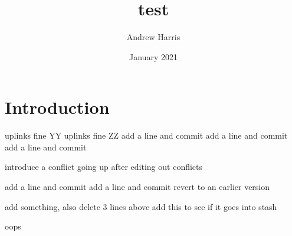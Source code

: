 \documentclass{article}
\title{test}
\author{Andrew Harris}
\date{January 2021}
\begin{document}
\maketitle

\section{Introduction}
uplinks fine YY
uplinks fine ZZ
add a line and commit
add a line and commit
add a line and commit

introduce a conflict going up
after editing out conflicts

add a line and commit
add a line and commit
revert to an earlier version

add something, also delete 3 lines above
add this to see if it goes into stash

oops
\end{document}
